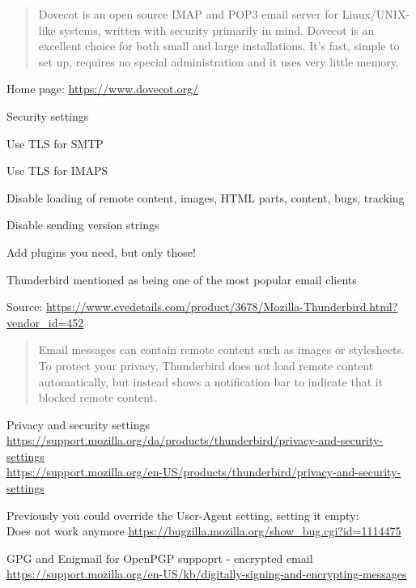 \documentclass[Screen16to9,17pt]{foils}
\begin{document}
\begin{quote}
Dovecot is an open source IMAP and POP3 email server for Linux/UNIX-like systems, written with security primarily in mind. Dovecot is an excellent choice for both small and large installations. It's fast, simple to set up, requires no special administration and it uses very little memory.
\end{quote}
Home page: \url{https://www.dovecot.org/}






\begin{list2}
\item Security settings
\item Use TLS for SMTP
\item Use TLS for IMAPS
\item Disable loading of remote content, images, HTML parts, content, bugs, tracking
\item Disable sending version strings
\item Add plugins you need, but only those!
\end{list2}

Thunderbird mentioned as being one of the most popular email clients



Source: {\footnotesize\url{https://www.cvedetails.com/product/3678/Mozilla-Thunderbird.html?vendor_id=452}}



\begin{quote}
Email messages can contain remote content such as images or stylesheets. To protect your privacy, Thunderbird does not load remote content automatically, but instead shows a notification bar to indicate that it blocked remote content.
\end{quote}

\begin{list2}
\item Privacy and security settings\\{\footnotesize \url{https://support.mozilla.org/da/products/thunderbird/privacy-and-security-settings}\\
\url{https://support.mozilla.org/en-US/products/thunderbird/privacy-and-security-settings}}
\item Previously you could override the User-Agent setting, setting it empty:\\
Does not work anymore
\url{https://bugzilla.mozilla.org/show_bug.cgi?id=1114475}
\item GPG and Enigmail for OpenPGP suppoprt - encrypted email\\
\url{https://support.mozilla.org/en-US/kb/digitally-signing-and-encrypting-messages}
\end{list2}
\end{document}
